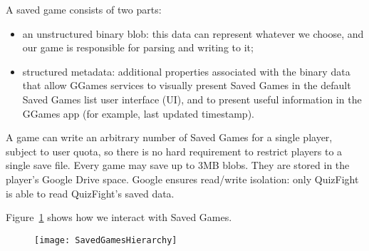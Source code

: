 A saved game consists of two parts:
\begin{itemize}
	\item an unstructured binary blob: this data can represent whatever we choose, and our game is responsible for parsing and writing to it;
	\item structured metadata: additional properties associated with the binary data that allow GGames services to visually present Saved Games in the default Saved Games list user interface (UI), and to present useful information in the GGames app (for example, last updated timestamp).
\end{itemize}
A game can write an arbitrary number of Saved Games for a single player, subject to user quota, so there is no hard requirement to restrict players to a single save file. Every game may save up to 3MB blobs. They are stored in the player's Google Drive space. Google ensures read/write isolation: only QuizFight is able to read QuizFight's saved data.

Figure~\ref{fig:saved-games-hierarchy} shows how we interact with Saved Games.
\begin{figure}
	\centering
	\texttt{[image: SavedGamesHierarchy]}
	\caption[Saved Games Hierarchy]
	\label{fig:saved-games-hierarchy}
\end{figure}
